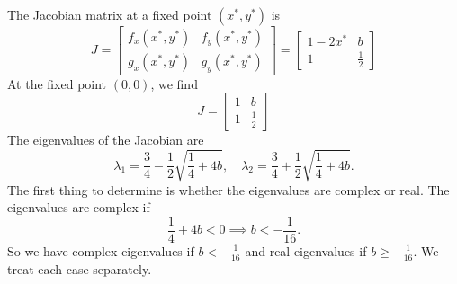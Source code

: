 \documentclass[reqno]{immbook}
\begin{document}
The Jacobian matrix 
at a fixed point $(x^*,y^*)$ is
\begin{equation}
   J = \begin{bmatrix}
          f_x(x^*,y^*) & f_y(x^*,y^*) \\
	  g_x(x^*,y^*) & g_y(x^*,y^*) 
       \end{bmatrix}
     = \begin{bmatrix}
          1-2x^* & b \\
	   1    & \frac{1}{2}
       \end{bmatrix}
\end{equation}
At the fixed point $(0,0)$, we find
\begin{equation}
  J = \begin{bmatrix}
          1 & b \\
	  1 & \frac{1}{2}
      \end{bmatrix}
\end{equation}
The eigenvalues of the Jacobian are
\begin{equation}
  \lambda_1 = \frac{3}{4} - \frac{1}{2} \sqrt{\frac{1}{4}+4b}, \quad
  \lambda_2 = \frac{3}{4} + \frac{1}{2} \sqrt{\frac{1}{4}+4b}.
\label{eqn:exeigvals}
\end{equation}
The first thing to determine is whether the eigenvalues are
complex or real.  The eigenvalues are complex if
\begin{equation}
  \frac{1}{4} + 4b < 0 \implies b < -\frac{1}{16}.
\end{equation}
So we have complex eigenvalues if $b < -\frac{1}{16}$ and real
eigenvalues if $b \ge -\frac{1}{16}$.
We treat each case separately.
\end{document}
